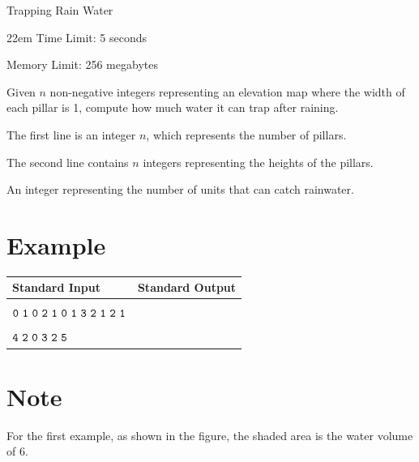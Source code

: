 \documentclass{xcpc}
\begin{document}
	\begin{problem}{Trapping Rain Water}
		\begin{boxedminipage}[c][1cm][t]{22em} 
			Time Limit: 5 seconds
			
			Memory Limit: 256 megabytes
		\end{boxedminipage}
		
		Given $n$ non-negative integers representing an elevation map where the width of each pillar is 1, compute how much water it can trap after raining.
		
		\begin{inputdes}
			The first line is an integer $n$, which represents the number of pillars.
			
			The second line contains $n$ integers representing the heights of the pillars.
		\end{inputdes}
		
		\begin{outputdes}
			An integer representing the number of units that can catch rainwater.
		\end{outputdes}

		\section*{Example}
		
		\begin{table}[h]
			\begin{tabular}{|l|l|}
				\hline
				\textbf{Standard Input} & \textbf{Standard Output} \\ \hline
				\makecell[l]{$\tt{12}$\\$\tt{0\ 1\ 0\ 2\ 1\ 0\ 1\ 3\ 2\ 1\ 2\ 1}$} & \makecell[l]{$\tt{6}$} \\ \hline
				\makecell[l]{$\tt{6}$\\$\tt{4\ 2\ 0\ 3\ 2\ 5}$} & \makecell[l]{$\tt{9}$} \\ \hline
			\end{tabular}
		\end{table}
		
		\section*{Note}
		
		For the first example, as shown in the figure, the shaded area is the water volume of 6.
		
\end{problem}
\end{document}
